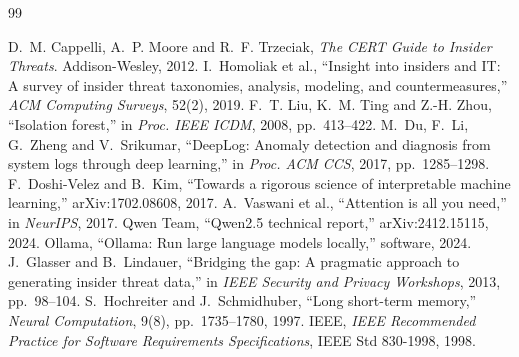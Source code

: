 \documentclass[openany]{tietreport}
\begin{document}
\renewcommand{\bibname}{References}
\begin{thebibliography}{99}
 D.~M. Cappelli, A.~P. Moore and R.~F. Trzeciak, \emph{The CERT Guide to Insider
Threats}. Addison-Wesley, 2012.
 I.~Homoliak et al., ``Insight into insiders and IT: A survey of insider threat
taxonomies, analysis, modeling, and countermeasures,'' \emph{ACM Computing Surveys}, 52(2), 2019.
 F.~T. Liu, K.~M. Ting and Z.-H. Zhou, ``Isolation forest,'' in \emph{Proc. IEEE
ICDM}, 2008, pp.~413--422.
 M.~Du, F.~Li, G.~Zheng and V.~Srikumar, ``DeepLog: Anomaly detection and diagnosis
from system logs through deep learning,'' in \emph{Proc. ACM CCS}, 2017, pp.~1285--1298.
 F.~Doshi-Velez and B.~Kim, ``Towards a rigorous science of interpretable
machine learning,'' arXiv:1702.08608, 2017.
 A.~Vaswani et al., ``Attention is all you need,'' in \emph{NeurIPS}, 2017.
 Qwen Team, ``Qwen2.5 technical report,'' arXiv:2412.15115, 2024.
 Ollama, ``Ollama: Run large language models locally,'' software, 2024.
 J.~Glasser and B.~Lindauer, ``Bridging the gap: A pragmatic approach to
generating insider threat data,'' in \emph{IEEE Security and Privacy Workshops}, 2013, pp.~98--104.
 S.~Hochreiter and J.~Schmidhuber, ``Long short-term memory,'' \emph{Neural
Computation}, 9(8), pp.~1735--1780, 1997.
 IEEE, \emph{IEEE Recommended Practice for Software Requirements Specifications}, IEEE Std
830-1998, 1998.
\end{thebibliography}
\end{document}

